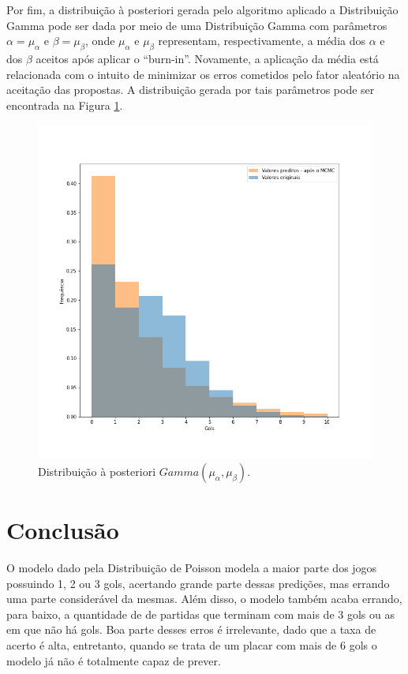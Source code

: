 \documentclass[11pt,letterpaper,twocolumn]{article}
\begin{document}
Por fim, a distribuição à posteriori gerada pelo algoritmo aplicado a Distribuição Gamma pode ser dada por meio de uma Distribuição Gamma com parâmetros $\alpha = \mu_\alpha$ e $\beta = \mu_\beta$, onde $\mu_\alpha$ e $\mu_\beta$ representam, respectivamente, a média dos $\alpha$ e dos $\beta$ aceitos após aplicar o ``burn-in''. Novamente, a aplicação da média está relacionada com o intuito de minimizar os erros cometidos pelo fator aleatório na aceitação das propostas. A distribuição gerada por tais parâmetros pode ser encontrada na Figura \ref{fig10g}.
\begin{figure}[hbt]
    \centering
    \includegraphics[scale = 0.40, center]{Gamma/fig10 - gamma.png}
    \caption{Distribuição à posteriori $Gamma(\mu_\alpha, \mu_\beta)$.}
    \label{fig10g}
\end{figure}

\section{Conclusão}
\justify

O modelo dado pela Distribuição de Poisson modela a maior parte dos jogos possuindo 1, 2 ou 3 gols, acertando grande parte dessas predições, mas errando uma parte considerável da mesmas. Além disso, o modelo também acaba errando, para baixo, a quantidade de de partidas que terminam com mais de 3 gols ou as em que não há gols. Boa parte desses erros é irrelevante, dado que a taxa de acerto é alta, entretanto, quando se trata de um placar com mais de 6 gols o modelo já não é totalmente capaz de prever.
\end{document}
